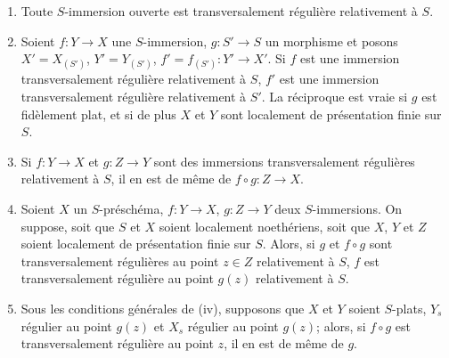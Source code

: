 \begin{proposition}[19.2.7]
\label{IV.19.2.7}
\begin{enumerate}
  \item[(i)] Toute $S$-immersion ouverte est transversalement régulière relativement à $S$.
  \item[(ii)] Soient $f:Y\to X$ une $S$-immersion, $g:S'\to S$ un morphisme et posons $X'=X_{(S')}$, $Y'=Y_{(S')}$, $f'=f_{(S')}:Y'\to X'$. Si $f$ est une immersion transversalement régulière relativement à $S$, $f'$ est une immersion transversalement régulière relativement à $S'$. La réciproque est vraie si $g$ est fidèlement plat, et si de plus $X$ et $Y$ sont localement de présentation finie sur $S$.
  \item[(iii)] Si $f:Y\to X$ et $g:Z\to Y$ sont des immersions transversalement régulières relativement à $S$, il en est de même de $f\circ g:Z\to X$.
  \item[(iv)] Soient $X$ un $S$-préschéma, $f:Y\to X$, $g:Z\to Y$ deux $S$-immersions. On suppose, soit que $S$ et $X$ soient localement noethériens, soit que $X$, $Y$ et $Z$ soient localement de présentation finie sur $S$. Alors, si $g$ et $f\circ g$ sont transversalement régulières au point $z\in Z$ relativement à $S$, $f$ est transversalement régulière au point $g(z)$ relativement à $S$.
  \item[(v)] Sous les conditions générales de (iv), supposons que $X$ et $Y$ soient $S$-plats, $Y_s$ régulier au point $g(z)$ et $X_s$ régulier au point $g(z)$; alors, si $f\circ g$ est transversalement régulière au point $z$, il en est de même de $g$.
\end{enumerate}
\end{proposition}

